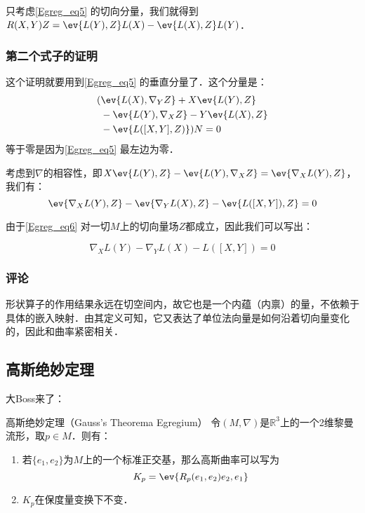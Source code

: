 只考虑\autoref{Egreg_eq5} 的切向分量，我们就得到$R(X, Y)Z=\ev{L(Y), Z}L(X)-\ev{L(X), Z}L(Y)$．








\subsubsection{第二个式子的证明}

这个证明就要用到\autoref{Egreg_eq5} 的垂直分量了．这个分量是：
\begin{equation}
\begin{aligned}
(&\ev{L(X), \nabla_YZ}+X\ev{L(Y), Z}\\&-\ev{L(Y), \nabla_XZ}-Y\ev{L(X), Z}\\&-\ev{L([X, Y], Z)})N=0
\end{aligned}
\end{equation}
等于零是因为\autoref{Egreg_eq5} 最左边为零．

考虑到$\nabla$的相容性，即$X\ev{L(Y), Z}-\ev{L(Y), \nabla_XZ}=\ev{\nabla_XL(Y), Z}$，我们有：
\begin{equation}\label{Egreg_eq6}
\ev{\nabla_XL(Y), Z}-\ev{\nabla_YL(X), Z}-\ev{L([X, Y]), Z}=0
\end{equation}

由于\autoref{Egreg_eq6} 对一切$M$上的切向量场$Z$都成立，因此我们可以写出：

\begin{equation}
\nabla_XL(Y)-\nabla_YL(X)-L([X, Y])=0
\end{equation}

\subsubsection{评论}

形状算子的作用结果永远在切空间内，故它也是一个内蕴（内禀）的量，不依赖于具体的嵌入映射．由其定义可知，它又表达了单位法向量是如何沿着切向量变化的，因此和曲率紧密相关．





\subsection{高斯绝妙定理}

大Boss来了：

\begin{theorem}{高斯绝妙定理（Gauss's Theorema Egregium）}
令$(M, \nabla)$是$\mathbb{R}^3$上的一个2维黎曼流形，取$p\in M$．则有：
\begin{enumerate}
\item 若$\{e_1, e_2\}$为$M$上的一个标准正交基，那么高斯曲率可以写为
\begin{equation}
K_p=\ev{R_p(e_1, e_2)e_2, e_1}
\end{equation}
\item $K_p$在保度量变换下不变．
\end{enumerate}

\end{theorem}

